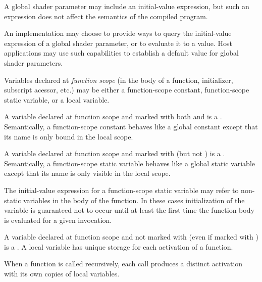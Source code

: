 A global shader parameter may include an initial-value expression, but such an expression does not affect the semantics of the compiled program.

\begin{Note}
An implementation may choose to provide ways to query the initial-value expression of a global shader parameter, or to evaluate it to a value.
Host applications may use such capabilities to establish a default value for global shader parameters.
\end{Note}


Variables declared at \emph{function scope} (in the body of a function, initializer, subscript acessor, etc.) may be either a function-scope constant, function-scope static variable, or a local variable.


A variable declared at function scope and marked with both  and  is a .
Semantically, a function-scope constant behaves like a global constant except that its name is only bound in the local scope.


A variable declared at function scope and marked with  (but not ) is a .
Semantically, a function-scope static variable behaves like a global static variable except that its name is only visible in the local scope.

The initial-value expression for a function-scope static variable may refer to non-static variables in the body of the function.
In these cases initialization of the variable is guaranteed not to occur until at least the first time the function body is evaluated for a given invocation.


A variable declared at function scope and not marked with  (even if marked with ) is a .
A local variable has unique storage for each activation of a function.

\begin{Note}
When a function is called recursively, each call produces a distinct activation with its own copies of local variables.
\end{Note}

